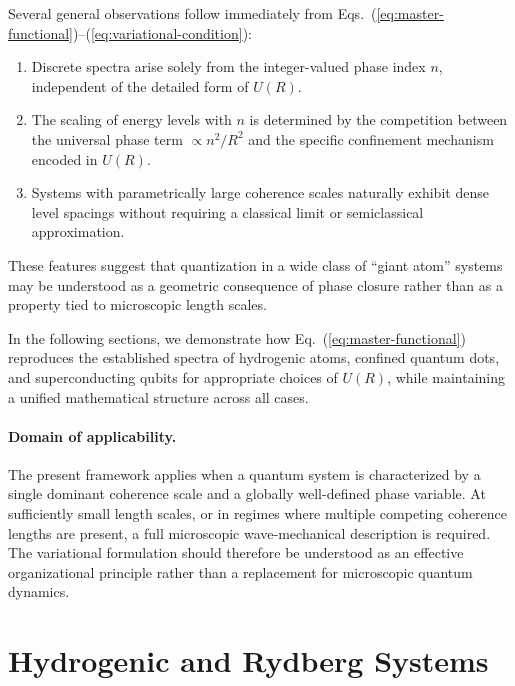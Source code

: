 \documentclass[11pt]{article}
\begin{document}
            Several general observations follow immediately from Eqs.~(\ref{eq:master-functional})--(\ref{eq:variational-condition}):

            \begin{enumerate}
                \item Discrete spectra arise solely from the integer-valued phase index $n$, independent of the detailed form of $U(R)$.
                \item The scaling of energy levels with $n$ is determined by the competition between the universal phase term $\propto n^2/R^2$ and the specific confinement mechanism encoded in $U(R)$.
                \item Systems with parametrically large coherence scales naturally exhibit dense level spacings without requiring a classical limit or semiclassical approximation.
            \end{enumerate}

            These features suggest that quantization in a wide class of ``giant atom'' systems may be understood as a geometric consequence of phase closure rather than as a property tied to microscopic length scales.

            In the following sections, we demonstrate how Eq.~(\ref{eq:master-functional}) reproduces the established spectra of hydrogenic atoms, confined quantum dots, and superconducting qubits for appropriate choices of $U(R)$, while maintaining a unified mathematical structure across all cases.

            \paragraph{Domain of applicability.}
            The present framework applies when a quantum system is characterized by a
            single dominant coherence scale and a globally well-defined phase variable.
            At sufficiently small length scales, or in regimes where multiple competing
            coherence lengths are present, a full microscopic wave-mechanical description
            is required. The variational formulation should therefore be understood as
            an effective organizational principle rather than a replacement for
            microscopic quantum dynamics.

    \section{Hydrogenic and Rydberg Systems}
\end{document}
